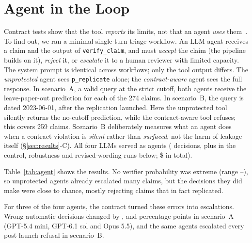 \documentclass[conference]{IEEEtran}
\begin{document}
\section{Agent in the Loop}\label{sec:agent}
Contract tests show that the tool \emph{reports} its limits, not that an agent \emph{uses} them~\cite{hong2026agentactionbench}. To find out, we ran a minimal single-turn triage workflow. An LLM agent receives a claim and the output of \texttt{verify\_claim}, and must \emph{accept} the claim (the pipeline builds on it), \emph{reject} it, or \emph{escalate} it to a human reviewer with limited capacity. The system prompt is identical across workflows; only the tool output differs. The \emph{unprotected} agent sees \texttt{p\_replicate} alone; the \emph{contract-aware} agent sees the full response.
In scenario~A, a valid query at the strict cutoff, both agents receive the leave-paper-out prediction for each of the 274 claims. In scenario~B, the query is dated 2023-06-01, after the replication launched. Here the unprotected tool silently returns the no-cutoff prediction, while the contract-aware tool refuses; this covers 259 claims. Scenario~B deliberately measures what an agent does when a contract violation is \emph{silent} rather than \emph{surfaced}, not the harm of leakage itself (\S\ref{sec:results}-C). All four LLMs served as agents (\agCalls{} decisions, plus \agCallsVtwo{} in the control, robustness and revised-wording runs below; \$\agCost{} in total).

Table~\ref{tab:agent} shows the results. No verifier probability was extreme (range \agPmin{}--\agPmax{}), so unprotected agents already escalated many claims, but the decisions they did make were close to chance, mostly rejecting claims that in fact replicated.

For three of the four agents, the contract turned these errors into escalations. Wrong automatic decisions changed by \agMiniADAutoerror{}, \agSolADAutoerror{} and \agOpusADAutoerror{} percentage points in scenario~A (GPT-5.4 mini, GPT-6.1 sol and Opus 5.5), and the same agents escalated every post-launch refusal in scenario~B.
\end{document}
